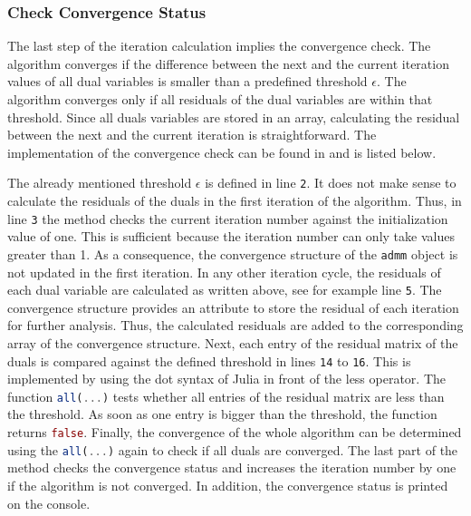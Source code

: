 \subsubsection*{Check Convergence Status}

The last step of the iteration calculation implies the convergence check. The algorithm converges if the difference between the next and the current iteration values of all dual variables is smaller than a predefined threshold $\epsilon$. The algorithm converges only if all residuals of the dual variables are within that threshold. Since all duals variables are stored in an array, calculating the residual between the next and the current iteration is straightforward. The implementation of the convergence check can be found in  and is listed below.



The already mentioned threshold $\epsilon$ is defined in line \texttt{2}. It does not make sense to calculate the residuals of the duals in the first iteration of the algorithm. Thus, in line \texttt{3} the method checks the current iteration number against the initialization value of one. This is sufficient because the iteration number can only take values greater than 1. As a consequence, the convergence structure of the \lstinline[language=julia]{admm} object is not updated in the first iteration. In any other iteration cycle, the residuals of each dual variable are calculated as written above, see for example line \texttt{5}. The convergence structure provides an attribute to store the residual of each iteration for further analysis. Thus, the calculated residuals are added to the corresponding array of the convergence structure. Next, each entry of the residual matrix of the duals is compared against the defined threshold in lines \texttt{14} to \texttt{16}. This is implemented by using the dot syntax of Julia in front of the less operator. The function \lstinline[language=julia]{all(...)} tests whether all entries of the residual matrix are less than the threshold. As soon as one entry is bigger than the threshold, the function returns \lstinline[language=julia]{false}. Finally, the convergence of the whole algorithm can be determined using the \lstinline[language=julia]{all(...)} again to check if all duals are converged. The last part of the method checks the convergence status and increases the iteration number by one if the algorithm is not converged. In addition, the convergence status is printed on the console.
